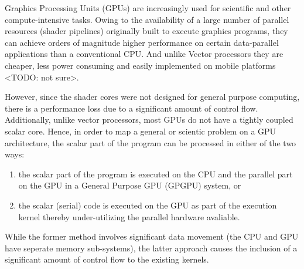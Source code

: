 
\par{Graphics Processing Units (GPUs) are increasingly used for scientific and other compute-intensive tasks. Owing to the availability of a large number of parallel resources (shader pipelines) originally built to execute graphics programs, they can achieve orders of magnitude higher performance on certain data-parallel applications than a conventional CPU. And unlike Vector processors they are cheaper, less power consuming and easily implemented on mobile platforms <TODO: not sure>.
}

\par{
However, since the shader cores were not designed for general purpose computing, there is a performance loss due to a significant amount of control flow. Additionally, unlike vector processors, most GPUs do not have a tightly coupled scalar core. Hence, in order to map a general or scientic problem on a GPU architecture, the scalar part of the program can be processed in either of the two ways:}

\begin{enumerate}
	\item the scalar part of the program is executed on the CPU and the parallel part on the GPU in a General Purpose GPU (GPGPU) system, or 
	\item the scalar (serial) code is executed on the GPU as part of the execution kernel thereby under-utilizing the parallel hardware avaliable.
\end{enumerate} 

\par{
While the former method involves significant data movement (the CPU and GPU have seperate memory sub-systems), the latter approach causes the inclusion of a significant amount of control flow to the existing kernels.}
